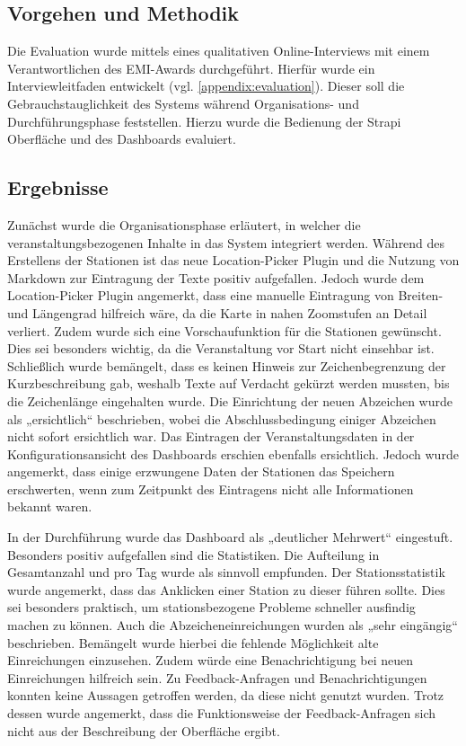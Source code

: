 \subsection{Vorgehen und Methodik}

Die Evaluation wurde mittels eines qualitativen Online-Interviews mit einem
Verantwortlichen des EMI-Awards durchgeführt. Hierfür wurde ein
Interviewleitfaden entwickelt (vgl. \autoref{appendix:evaluation}). Dieser soll
die Gebrauchstauglichkeit des Systems während Organisations- und
Durchführungsphase feststellen. Hierzu wurde die Bedienung der Strapi Oberfläche
und des Dashboards evaluiert.

\subsection{Ergebnisse}

Zunächst wurde die Organisationsphase erläutert, in welcher die
veranstaltungsbezogenen Inhalte in das System integriert werden. Während des
Erstellens der Stationen ist das neue Location-Picker Plugin und die Nutzung von
Markdown zur Eintragung der Texte positiv aufgefallen. Jedoch wurde dem
Location-Picker Plugin angemerkt, dass eine manuelle Eintragung von Breiten- und
Längengrad hilfreich wäre, da die Karte in nahen Zoomstufen an Detail verliert.
Zudem wurde sich eine Vorschaufunktion für die Stationen gewünscht. Dies sei
besonders wichtig, da die Veranstaltung vor Start nicht einsehbar ist.
Schließlich wurde bemängelt, dass es keinen Hinweis zur Zeichenbegrenzung der
Kurzbeschreibung gab, weshalb Texte auf Verdacht gekürzt werden mussten, bis die
Zeichenlänge eingehalten wurde. Die Einrichtung der neuen Abzeichen wurde als
„ersichtlich“ beschrieben, wobei die Abschlussbedingung einiger Abzeichen nicht
sofort ersichtlich war. Das Eintragen der Veranstaltungsdaten in der
Konfigurationsansicht des Dashboards erschien ebenfalls ersichtlich. Jedoch
wurde angemerkt, dass einige erzwungene Daten der Stationen das Speichern
erschwerten, wenn zum Zeitpunkt des Eintragens nicht alle Informationen bekannt
waren.

In der Durchführung wurde das Dashboard als „deutlicher Mehrwert“ eingestuft.
Besonders positiv aufgefallen sind die Statistiken. Die Aufteilung in
Gesamtanzahl und pro Tag wurde als sinnvoll empfunden. Der Stationsstatistik
wurde angemerkt, dass das Anklicken einer Station zu dieser führen sollte. Dies
sei besonders praktisch, um stationsbezogene Probleme schneller ausfindig machen
zu können. Auch die Abzeicheneinreichungen wurden als „sehr eingängig“
beschrieben. Bemängelt wurde hierbei die fehlende Möglichkeit alte Einreichungen
einzusehen. Zudem würde eine Benachrichtigung bei neuen Einreichungen hilfreich
sein. Zu Feedback-Anfragen und Benachrichtigungen konnten keine Aussagen
getroffen werden, da diese nicht genutzt wurden. Trotz dessen wurde angemerkt,
dass die Funktionsweise der Feedback-Anfragen sich nicht aus der Beschreibung
der Oberfläche ergibt.

